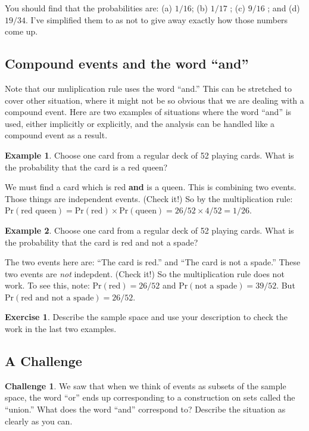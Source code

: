 \documentclass[12pt,letterpaper]{article}
\theoremstyle{definition}
\newtheorem{example}{Example}
\newtheorem{exercise}[question]{Exercise}
\newtheorem*{challenge}{Challenge}
\begin{document}
You should find that the probabilities are: (a) $1/16$; (b) $1/17$ ; (c) $9/16$ ; and (d) $19/34$. I've simplified them to as not to give away exactly how those numbers come up.


\subsection*{Compound events and the word ``and''} %

Note that our muliplication rule uses the word ``and.''
This can be stretched to cover other situation, where it might not be so obvious that we are dealing with a compound event.
Here are two examples of situations where the word ``and'' is used, either implicitly or explicitly, and the analysis can be handled like a compound event as a result.

\begin{example}
Choose one card from a regular deck of 52 playing cards.
What is the probability that the card is a red queen?

We must find a card which is red \textbf{and} is a queen. 
This is combining two events.
Those things are independent events. 
(Check it!)
So by the multiplication rule: $\mathrm{Pr}(\text{red queen}) = \mathrm{Pr}(\text{red}) \times \mathrm{Pr}(\text{queen}) = 26/52 \times 4/52 = 1/26$.
\end{example}

\begin{example}
Choose one card from a regular deck of 52 playing cards.
What is the probability that the card is red and not a spade?

The two events here are: ``The card is red.'' and ``The card is not a spade.''
These two events are \emph{not} indepdent. 
(Check it!)
So the multiplication rule does not work.
To see this, note:  $\mathrm{Pr}(\text{red}) = 26/52$ and $\mathrm{Pr}(\text{not a spade}) = 39/52$.
But $\mathrm{Pr}(\text{red and not a spade}) = 26/52$.
\end{example}

\begin{exercise}
Describe the sample space and use your description to check the work in the last two examples.
\end{exercise}

\subsection*{A Challenge} %

\begin{challenge}
We saw that when we think of events as subsets of the sample space, the word ``or'' ends up corresponding to a construction on sets called the ``union.''
What does the word ``and'' correspond to? 
Describe the situation as clearly as you can.
\end{challenge}



\end{document}
